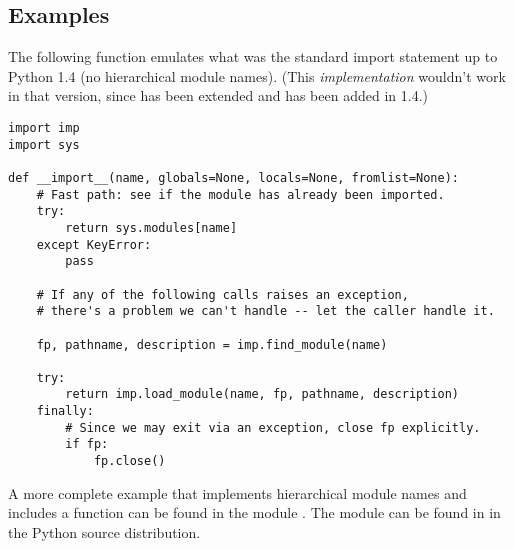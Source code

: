 \subsection{Examples}
\label{examples-imp}

The following function emulates what was the standard import statement
up to Python 1.4 (no hierarchical module names).  (This
\emph{implementation} wouldn't work in that version, since
 has been extended and
 has been added in 1.4.)

\begin{verbatim}
import imp
import sys

def __import__(name, globals=None, locals=None, fromlist=None):
    # Fast path: see if the module has already been imported.
    try:
        return sys.modules[name]
    except KeyError:
        pass

    # If any of the following calls raises an exception,
    # there's a problem we can't handle -- let the caller handle it.

    fp, pathname, description = imp.find_module(name)
    
    try:
        return imp.load_module(name, fp, pathname, description)
    finally:
        # Since we may exit via an exception, close fp explicitly.
        if fp:
            fp.close()
\end{verbatim}

A more complete example that implements hierarchical module names and
includes a  function can be
found in the module .  The
 module can be found in  in the
Python source distribution.
